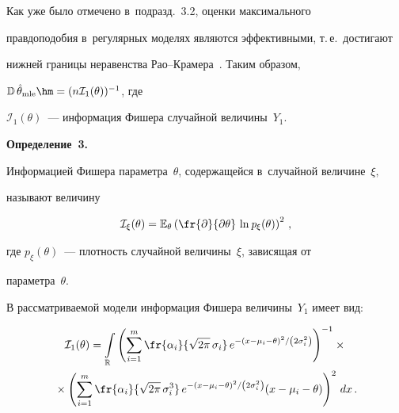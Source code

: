 Как уже было отмечено в~подразд.~3.2, оценки максимального 


правдоподобия в~регулярных моделях являются эффективными, т.\,е.\ достигают 


нижней границы неравенства Рао--Кра\-ме\-ра~\cite{lagutin}. Таким образом,


$\mathbb{D}\,\hat{\theta}_{\mathrm{mle}} \hm= (n\mathcal{I}_1(\theta))^{-1}$, где 


$\mathcal{I}_1(\theta)$~--- информация Фишера случайной величины~$Y_1$.








\smallskip





\noindent


\textbf{Определение~3.}


Информацией Фишера параметра~$\theta$, содержащейся в~случайной величине~$\xi,$ 


называют величину


$$


\mathcal{I}_\xi(\theta) = \mathbb{E}_\theta\left(\fr{\partial}{\partial 


\theta}\,\ln \mathit{p}_\xi(\theta)\right)^2\,,


$$


где $\mathit{p}_\xi(\theta)$~--- плотность случайной величины~$\xi$, зависящая от 


параметра~$\theta$.








\smallskip








В рассматриваемой модели информация Фишера величины~$Y_1$ имеет вид:


\begin{multline}


\label{Fisher_info}


\mathcal{I}_1(\theta) = 


\int\limits_\mathbb{R}\left(\sum\limits_{i=1}^m\fr{\alpha_i}{\sqrt{2\pi}\,\sigma_i}


\,e^{{-\left(x-\mu_i-\theta\right)^2}/\left({2\sigma_i^2}\right)}\right)^{-1} \times{}\\


{}\times


\left(\sum\limits_{i=1}^m\fr{\alpha_i}{\sqrt{2\pi}\,\sigma_i^3}\,e^{{-\left(x-


\mu_i-\theta\right)^2}/\left({2\sigma_i^2}\right)}(x-\mu_i-\theta)\right)^2 \,{d}x\,.


\end{multline}





